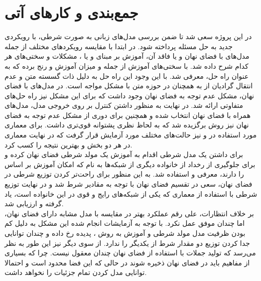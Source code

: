 \chapter{جمع‌بندی و کار‌های آتی}\label{Chap:Chap6}
\minitoc

در این پروژه سعی شد تا ضمن بررسی مدل‌های زبانی به صورت شرطی، با رویکردی جدید به حل مسئله پرداخته شود. در ابتدا با مقایسه رویکرد‌های مختلف از جمله مدل‌های با فضای نهان و یا فاقد آن، آموزش بر مبنای \maxlikelihood{} و یا \gan{}، مشکلات و سختی‌های هر کدام شرح داده شد. \gan{} با سختی‌های آموزش از جمله \modecollapse{} و میزان آموزش \discriminator{} و \generator{} رنج برده که به عنوان راه حل، \wgan{} معرفی شد. با این وجود این راه حل به دلیل ذات گسسته متن و عدم انتقال گرادیان از \discriminator{} به \generator{} همچنان در حوزه متن با مشکل مواجه است.
در مدل‌های با فضای نهان، مشکل عدم توجه به فضای نهان وجود داشت که برای این مشکل نیز راه حل‌های متفاوتی ارائه شد. در نهایت به منظور داشتن کنترل بر روی خروجی مدل، مدل‌های همراه با فضای نهان انتخاب شده و همچنین برای دوری از مشکل عدم توجه به فضای نهان نیز روش \wae{} برگزیده شد که به لحاظ نظری پشتوانه قوی‌تری داشت. برای معماری مورد استفاده در \encoder{} و \decoder{} نیز حالت‌های مختلف مورد آزمایش قرار گرفت که در نهایت معماری \transformer{} در هر دو بخش \encoder{} و \decoder{} بهترین نتیجه را کسب کرد.
\\
برای داشتن یک مدل شرطی اقدام به آموزش یک مولد شرطی فضای نهان کرده و برای جلوگیری از رخداد \modecollapse{} از خانواده دیگری از شبکه‌ها به نام \normalizingflownets{} که امکان آموزش بر اساس \maxlikelihood{} را دارند، معرفی و استفاده شد. به این منظور برای راحت‌تر کردن توزیع شرطی در فضای نهان، سعی در تقسیم فضای نهان با توجه به مقادیر شرط شد و در نهایت توزیع شرطی با استفاده از معماری  که یکی از شبکه‌های رایج و قوی در این خانواده است، یاد گرفته و ارزیابی شد.
\\
بر خلاف انتظارات، علی رقم عملکرد بهتر در مقایسه با مدل مشابه دارای فضای نهان، اما چندان موفق عمل نکرد. با توجه به آزمایشات انجام شده  این مشکل به دلیل کم بودن ظرفیت مدل مولد شرطی و آموزش به روش \maxlikelihood{}، پدیده \meanseeking{} رخ داده و چندان توانایی جدا کردن توزیع دو مقدار شرط از یکدیگر را ندارد. از سوی دیگر نیز این طور به نظر می‌رسد که تولید جملات با استفاده از فضای نهان چندان معقول نیست. چرا که بسیاری از مفاهیم باید در فضای نهان ذخیره شوند در حالی که این فضا محدود است و احتمالا توانایی مدل کردن تمام جزئیات را نخواهد داشت.